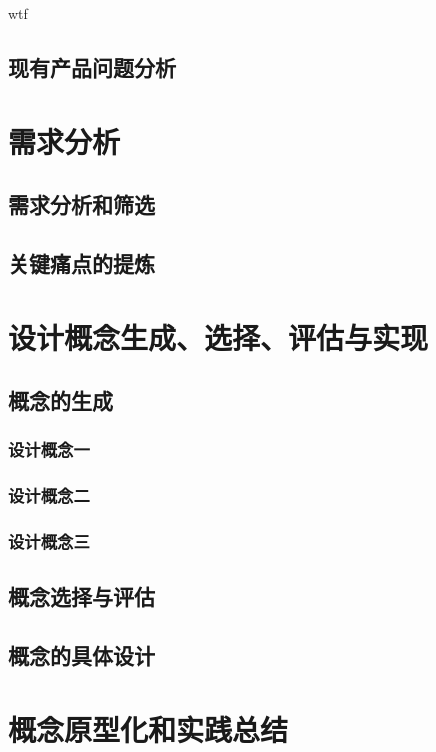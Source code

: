 \documentclass[a4paper]{ctexart}
\newcommand{ \upcite}[1]{\textsuperscript{\textsuperscript{\cite{#1} } }}
\numberwithin{equation}{section}
\numberwithin{table}{section}
\numberwithin{figure}{section}
\begin{document}
wtf\upcite{2004Introducing}

\subsection{现有产品问题分析}

\section{需求分析}

\subsection{需求分析和筛选}

\subsection{关键痛点的提炼}

\section{设计概念生成、选择、评估与实现}


\subsection{概念的生成}

\subsubsection{设计概念一}
\subsubsection{设计概念二}
\subsubsection{设计概念三}

\subsection{概念选择与评估}
\subsection{概念的具体设计}


\section{概念原型化和实践总结}
\end{document}

